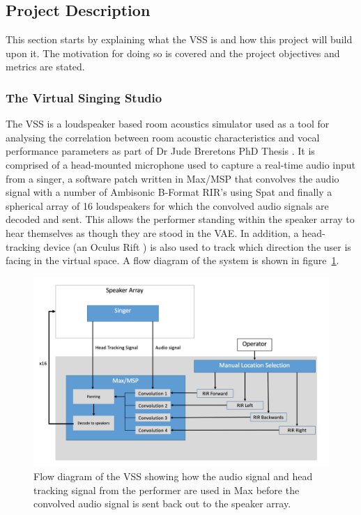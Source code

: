 \documentclass[../../main.tex]{subfiles}
\begin{document}
\subsection{Project Description}
	
	This section starts by explaining what the \ac{VSS} is and how this project will build upon it. The motivation for doing so is covered and the project objectives and metrics are stated.

	\subsubsection{The Virtual Singing Studio}

		The \ac{VSS} is a loudspeaker based room acoustics simulator used as a tool for analysing the correlation between room acoustic characteristics and vocal performance parameters as part of Dr Jude Breretons PhD Thesis \cite{Brereton2014}. It is comprised of a head-mounted microphone used to capture a real-time audio input from a singer, a software patch written in Max/MSP that convolves the audio signal with a number of Ambisonic B-Format \ac{RIR}'s using Spat and finally a spherical array of 16 loudspeakers for which the convolved audio signals are decoded and sent. This allows the performer standing within the speaker array to hear themselves as though they are stood in the \ac{VAE}. In addition, a head-tracking device (an Oculus Rift \cite{oculus}) is also used to track which direction the user is facing in the virtual space. A flow diagram of the system is shown in figure~\ref{vssDiagram}.

	
		\begin{figure}
			\centerline{\includegraphics[scale = 0.45]{Sections/Background/images/vssDiagram.png}}
			\caption{Flow diagram of the VSS showing how the audio signal and head tracking signal from the performer are used in Max before the convolved audio signal is sent back out to the speaker array.}
			\label{vssDiagram}
		\end{figure}
\end{document}
